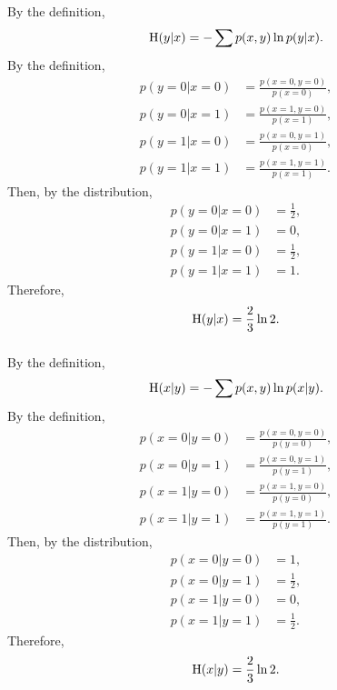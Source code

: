 \subsubsection{}
By the definition,
%
\begin{equation}
{\rm H}(y | x) 
= 
- 
\sum 
p(x, y) 
\ln p(y | x).
\end{equation}
%
By the definition,
%
\begin{equation}
\begin{aligned}
p(y = 0 | x = 0) 
&= 
\frac{p(x = 0, y = 0)}{p(x = 0)}, 
\\
p(y = 0 | x = 1) 
&= 
\frac{p(x = 1, y = 0)}{p(x = 1)}, 
\\
p(y = 1 | x = 0) 
&= 
\frac{p(x = 0, y = 1)}{p(x = 0)}, 
\\
p(y = 1 | x = 1) 
&= 
\frac{p(x = 1, y = 1)}{p(x = 1)}.
\end{aligned}
\end{equation}
%
Then, by the distribution,
%
\begin{equation}
\begin{aligned}
p(y = 0 | x = 0) 
&=
\frac{1}{2}, 
\\
p(y = 0 | x = 1) 
&= 
0, 
\\
p(y = 1 | x = 0) 
&= 
\frac{1}{2}, 
\\
p(y = 1 | x = 1) 
&= 
1.
\end{aligned}
\end{equation}
%
Therefore,
%
\begin{equation}
{\rm H}(y | x) 
= 
\frac{2}{3} 
\ln 2.
\end{equation}
%


\subsubsection{}
By the definition,
%
\begin{equation}
{\rm H}(x | y) 
= 
- 
\sum 
p(x, y) 
\ln p(x | y).
\end{equation}
%
By the definition,
%
\begin{equation}
\begin{aligned}
p(x = 0 | y = 0) 
&= 
\frac{p(x = 0, y = 0)}{p(y = 0)}, 
\\
p(x = 0 | y = 1) 
&= 
\frac{p(x = 0, y = 1)}{p(y = 1)}, 
\\
p(x = 1 | y = 0) 
&= 
\frac{p(x = 1, y = 0)}{p(y = 0)}, 
\\
p(x = 1 | y = 1) 
&= 
\frac{p(x = 1, y = 1)}{p(y = 1)}.
\end{aligned}
\end{equation}
%
Then, by the distribution,
%
\begin{equation}
\begin{aligned}
p(x = 0 | y = 0) 
&= 
1, 
\\
p(x = 0 | y = 1) 
&= 
\frac{1}{2}, 
\\
p(x = 1 | y = 0) 
&= 
0, 
\\
p(x = 1 | y = 1) 
&= 
\frac{1}{2}.
\end{aligned}
\end{equation}
%
Therefore,
%
\begin{equation}
{\rm H}(x | y) 
= 
\frac{2}{3} 
\ln 2.
\end{equation}
%


